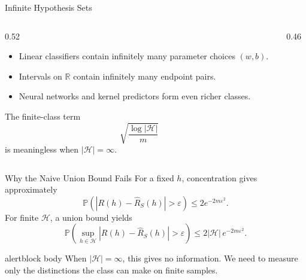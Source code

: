 \documentclass[aspectratio=169,10pt]{beamer}
\newcommand{\Hc}{\mathcal{H}}
\newcommand{\Rhat}{\widehat{R}_S}
\newcommand{\eps}{\varepsilon}
\newcommand{\Prb}{\mathbb{P}}
\newcommand{\abs}[1]{\left\lvert #1\right\rvert}
\begin{document}
\begin{frame}[t]{Infinite Hypothesis Sets}
  \vspace{0.04cm}
  \begin{columns}[T,totalwidth=\textwidth]
    \begin{column}{0.52\textwidth}
      \begin{itemize}
        \setlength{\itemsep}{0.13cm}
        \item Linear classifiers contain infinitely many parameter choices $(w,b)$.
        \item Intervals on $\mathbb{R}$ contain infinitely many endpoint pairs.
        \item Neural networks and kernel predictors form even richer classes.
      \end{itemize}
      \vspace{0.08cm}
      The finite-class term
      \[
        \sqrt{\frac{\log\abs{\Hc}}{m}}
      \]
      is meaningless when $\abs{\Hc}=\infty$.
    \end{column}
    \begin{column}{0.46\textwidth}
      \begin{center}
      \end{center}
    \end{column}
  \end{columns}
\end{frame}

\begin{frame}[t]{Why the Naive Union Bound Fails}
  \vspace{0.06cm}
  For a fixed $h$, concentration gives approximately
  \[
    \Prb\!\left(\abs{R(h)-\Rhat(h)}>\eps\right)
    \le 2e^{-2m\eps^2}.
  \]
  For finite $\Hc$, a union bound yields
  \[
    \Prb\!\left(\sup_{h\in\Hc}\abs{R(h)-\Rhat(h)}>\eps\right)
    \le 2\abs{\Hc}\,e^{-2m\eps^2}.
  \]
  \vspace{0.05cm}
  \begin{beamercolorbox}[rounded=true,sep=0.20cm,wd=\linewidth]{alertblock body}
    When $\abs{\Hc}=\infty$, this gives no information. We need to measure only the distinctions the class can make on finite samples.
  \end{beamercolorbox}
\end{frame}
\end{document}

